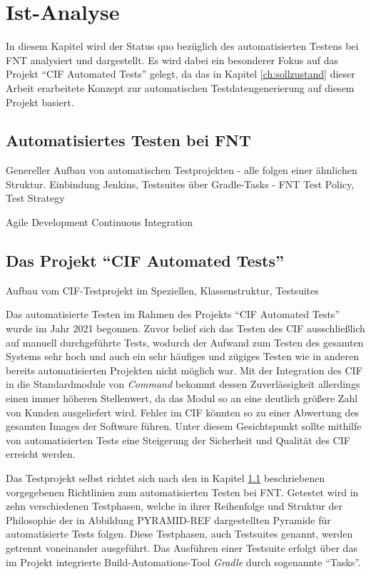 
\chapter{Ist-Analyse}\label{ch:istanalyse}
In diesem Kapitel wird der Status quo bezüglich des automatisierten Testens bei FNT analysiert und dargestellt. Es wird dabei ein besonderer Fokus auf das Projekt \enquote{CIF Automated Tests} gelegt, da das in Kapitel \ref{ch:sollzustand} dieser Arbeit erarbeitete Konzept zur automatischen Testdatengenerierung auf diesem Projekt basiert.

\section{Automatisiertes Testen bei FNT}\label{sec:autotestsfnt}
Genereller Aufbau von automatischen Testprojekten - alle folgen einer ähnlichen Struktur. Einbindung Jenkins, Testsuites über Gradle-Tasks - FNT Test Policy, Test Strategy

Agile Development
Continuous Integration

\section{Das Projekt \enquote{CIF Automated Tests}}\label{sec:ciftestprojekt}
Aufbau vom CIF-Testprojekt im Speziellen, Klassenstruktur, Testsuites

Das automatisierte Testen im Rahmen des Projekts \enquote{CIF Automated Tests} wurde im Jahr 2021 begonnen. Zuvor belief sich das Testen des \ac{CIF} ausschließlich auf manuell durchgeführte Tests, wodurch der Aufwand zum Testen des gesamten Systems sehr hoch und auch ein sehr häufiges und zügiges Testen wie in anderen bereits automatisierten Projekten nicht möglich war. Mit der Integration des \ac{CIF} in die Standardmodule von \textit{Command} bekommt dessen Zuverlässigkeit allerdings einen immer höheren Stellenwert, da das Modul so an eine deutlich größere Zahl von Kunden ausgeliefert wird. Fehler im \ac{CIF} könnten so zu einer Abwertung des gesamten Images der Software führen. Unter diesem Gesichtspunkt sollte mithilfe von automatisierten Tests eine Steigerung der Sicherheit und Qualität des \ac{CIF} erreicht werden.

Das Testprojekt selbst richtet sich nach den in Kapitel \ref{sec:autotestsfnt} beschriebenen vorgegebenen Richtlinien zum automatisierten Testen bei FNT. Getestet wird in zehn verschiedenen Testphasen, welche in ihrer Reihenfolge und Struktur der Philosophie der in Abbildung PYRAMID-REF dargestellten Pyramide für automatisierte Tests folgen. Diese Testphasen, auch Testsuites genannt, werden getrennt voneinander ausgeführt. Das Ausführen einer Testsuite erfolgt über das im Projekt integrierte Build-Automations-Tool \textit{Gradle} durch sogenannte \enquote{Tasks}. 

